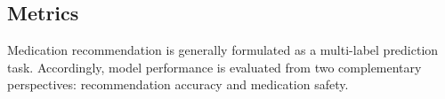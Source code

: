 \documentclass[manuscript,review]{acmart}
\begin{document}



\subsection{Metrics}

Medication recommendation is generally formulated as a multi-label prediction task. Accordingly, model performance is evaluated from two complementary perspectives: recommendation accuracy and medication safety.
\end{document}
